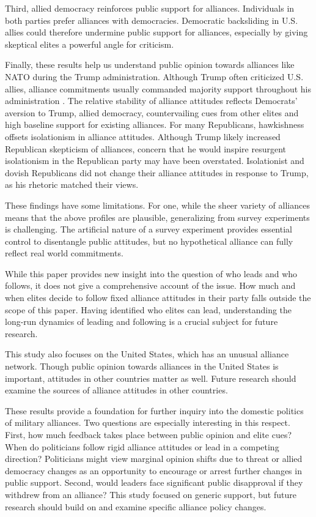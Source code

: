 \documentclass[12pt]{article}
\begin{document}
Third, allied democracy reinforces public support for alliances.
Individuals in both parties prefer alliances with democracies. 
Democratic backsliding in U.S. allies could therefore undermine public support for alliances, especially by giving skeptical elites a powerful angle for criticism. 


Finally, these results help us understand public opinion towards alliances like NATO during the Trump administration.
Although Trump often criticized U.S. allies, alliance commitments usually commanded majority support throughout his administration \citep{PewNATO2020}. 
The relative stability of alliance attitudes reflects Democrats' aversion to Trump, allied democracy, countervailing cues from other elites and high baseline support for existing alliances. 
For many Republicans, hawkishness offsets isolationism in alliance attitudes.
Although Trump likely increased Republican skepticism of alliances, concern that he would inspire resurgent isolationism in the Republican party may have been overstated.
Isolationist and dovish Republicans did not change their alliance attitudes in response to Trump, as his rhetoric matched their views. 


These findings have some limitations. 
For one, while the sheer variety of alliances means that the above profiles are plausible, generalizing from survey experiments is challenging. 
The artificial nature of a survey experiment provides essential control to disentangle public attitudes, but no hypothetical alliance can fully reflect real world commitments.


While this paper provides new insight into the question of who leads and who follows, it does not give a comprehensive account of the issue. 
How much and when elites decide to follow fixed alliance attitudes in their party falls outside the scope of this paper. 
Having identified who elites can lead, understanding the long-run dynamics of leading and following is a crucial subject for future research. 


This study also focuses on the United States, which has an unusual alliance network. 
Though public opinion towards alliances in the United States is important, attitudes in other countries matter as well. 
Future research should examine the sources of alliance attitudes in other countries. 


These results provide a foundation for further inquiry into the domestic politics of military alliances. 
Two questions are especially interesting in this respect.
First, how much feedback takes place between public opinion and elite cues? 
When do politicians follow rigid alliance attitudes or lead in a competing direction? 
Politicians might view marginal opinion shifts due to threat or allied democracy changes as an opportunity to encourage or arrest further changes in public support.
Second, would leaders face significant public disapproval if they withdrew from an alliance? 
This study focused on generic support, but future research should build on \citet{TomzWeeks2021} and examine specific alliance policy changes. 
\end{document}
